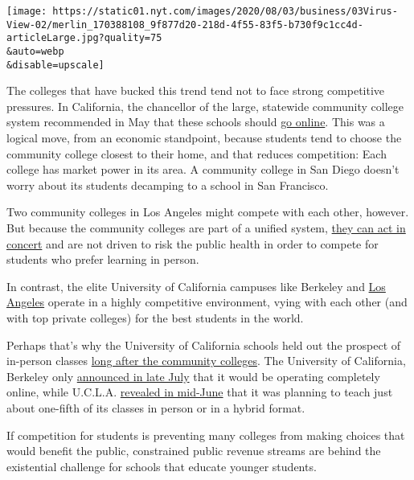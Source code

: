 \texttt{[image: https://static01.nyt.com/images/2020/08/03/business/03Virus-View-02/merlin\_170388108\_9f877d20-218d-4f55-83f5-b730f9c1cc4d-articleLarge.jpg?quality=75\\\&auto=webp\\\&disable=upscale]}

The colleges that have bucked this trend tend not to face strong
competitive pressures. In California, the chancellor of the large,
statewide community college system recommended in May that these schools
should
\href{https://www.cbs8.com/article/news/local/california/california-community-college-chancellor-endorses-going-online-only-this-fall/509-bab87578-c4be-4f25-bce7-58bdecf57c90}{go
online}. This was a logical move, from an economic standpoint, because
students tend to choose the community college closest to their home, and
that reduces competition: Each college has market power in its area. A
community college in San Diego doesn't worry about its students
decamping to a school in San Francisco.

Two community colleges in Los Angeles might compete with each other,
however. But because the community colleges are part of a unified
system,
\href{https://edsource.org/2020/some-california-colleges-decide-to-offer-all-fall-classes-online/630660}{they
can act in concert} and are not driven to risk the public health in
order to compete for students who prefer learning in person.

In contrast, the elite University of California campuses like Berkeley
and \href{https://www.ucla.edu/}{Los Angeles} operate in a highly
competitive environment, vying with each other (and with top private
colleges) for the best students in the world.

Perhaps that's why the University of California schools held out the
prospect of in-person classes
\href{https://www.sacbee.com/news/politics-government/capitol-alert/article244116777.html}{long
after the community colleges}. The University of California, Berkeley
only
\href{https://www.berkeleyside.com/2020/07/21/uc-berkeley-online-covid-19-fall-semester}{announced
in late July} that it would be operating completely online, while
U.C.L.A.
\href{https://newsroom.ucla.edu/releases/preparations-for-the-2020-21-academic-year}{revealed
in mid-June} that it was planning to teach just about one-fifth of its
classes in person or in a hybrid format.

If competition for students is preventing many colleges from making
choices that would benefit the public, constrained public revenue
streams are behind the existential challenge for schools that educate
younger students.

